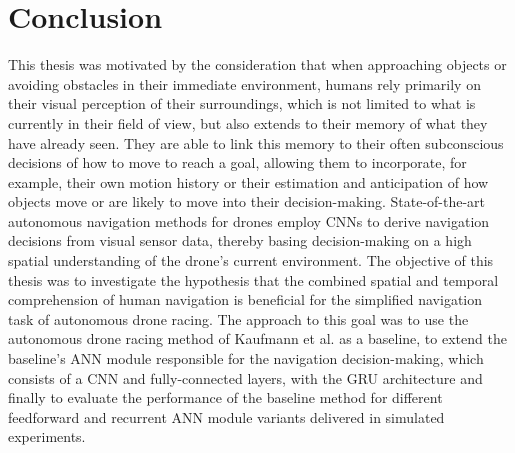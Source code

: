 \section{Conclusion}
This thesis was motivated by the consideration that when
approaching objects or avoiding obstacles in their immediate environment,
humans rely primarily on their visual perception of their surroundings, 
which is not limited to what is currently in their field of view, 
but also extends to their memory of what they have already seen.
They are able to link this memory to their often subconscious
decisions of how to move to reach a goal,
allowing them to incorporate, for example, 
their own motion history or their estimation and anticipation of how objects move or are likely to move
into their decision-making.
State-of-the-art autonomous navigation methods for drones 
employ CNNs to derive navigation decisions from visual sensor data,
thereby basing decision-making on a high spatial understanding of the drone's current environment.
The objective of this thesis was to investigate the hypothesis
that the combined spatial and temporal comprehension of human navigation
is beneficial for the simplified navigation task of autonomous drone racing.
The approach to this goal was 
to use the autonomous drone racing method of Kaufmann et al. \cite{Kaufmann2018} as a baseline,
to extend the baseline's ANN module responsible for the navigation decision-making,
which consists of a CNN and fully-connected layers,
with the GRU architecture
and finally to evaluate the performance 
of the baseline method for different feedforward and recurrent ANN module variants delivered in simulated experiments.


